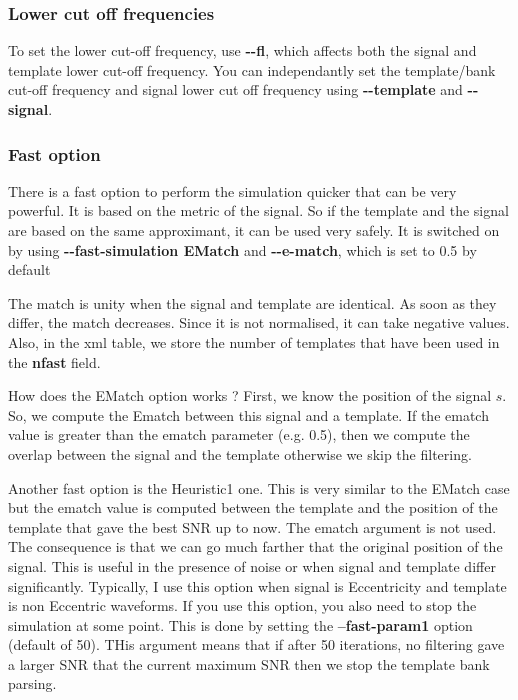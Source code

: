 \documentclass[a4paper,10pt]{article}
\newcommand{\code}[1]{%
\begin{center}
  \fboxsep=10pt
  \fcolorbox{black}{yellow}
  { \parbox[c]{12cm}{ \color{blue}{#1}}}
\end{center}}
\begin{document}
\subsubsection{Lower cut off frequencies}
To set the lower cut-off frequency, use \textbf{{-}{-}fl}, which affects both the signal and template lower cut-off frequency. You can independantly set the template/bank cut-off frequency and signal lower cut off frequency using \textbf{{-}{-}template} and \textbf{{-}{-}signal}.

\subsubsection{Fast option}
There is a fast option to perform the simulation quicker that can be very powerful. It is based on the metric of the signal. So if the template and the signal are based on the same approximant, it can be used very safely. It is switched on by using \textbf{{-}{-}fast-simulation EMatch} and \textbf{{-}{-}e-match}, which is set to 0.5 by default

\code{./lalapps\_BankEfficiency --fast-simulation EMatch --e-match 0.5 --xml-output}


The match is unity when the signal and template are identical. As soon as they differ, the match decreases. Since it is not normalised, it can take negative values. Also, in the xml table, we store the number of templates that have been used in the \textbf{nfast} field.

How does the EMatch option works ? First, we know the position of the signal $s$. So, we compute the Ematch between this signal and a template. If the ematch value is greater than the ematch parameter (e.g. 0.5), then we compute the overlap between the signal and the template otherwise we skip the filtering. 

Another fast option is the Heuristic1 one. This is very similar to the EMatch case but the ematch value is computed between the template and the position of the template that gave the best SNR up to now. The ematch argument is not used. The consequence is that we can go much farther that the original position of the signal. This is useful in the presence of noise or when signal and template differ significantly. Typically, I use this option when signal is Eccentricity and template is non Eccentric waveforms. If you use this option, you also need to stop the simulation at some point. This is done by setting the \textbf{--fast-param1} option (default of 50). THis argument means that if after 50 iterations, no filtering gave a larger SNR that the current maximum SNR then we stop the template bank parsing.
\end{document}
